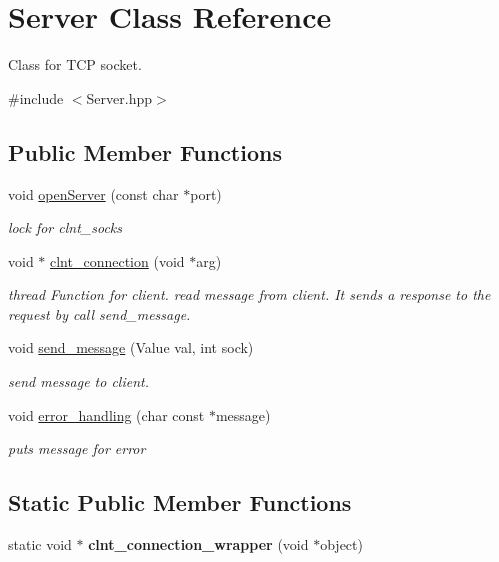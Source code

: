 \hypertarget{class_server}{}\section{Server Class Reference}
\label{class_server}


Class for T\+CP socket.  




{\ttfamily \#include $<$Server.\+hpp$>$}

\subsection*{Public Member Functions}
\begin{DoxyCompactItemize}
\item 
void \mbox{\hyperlink{class_server_aff3205e599f2b9680b38407d4d3fe2fb}{open\+Server}} (const char $\ast$port)
\begin{DoxyCompactList}\small\item\em lock for clnt\+\_\+socks \end{DoxyCompactList}\item 
void $\ast$ \mbox{\hyperlink{class_server_a4adbe902c237615f2ec2ecc21e0f4dfa}{clnt\+\_\+connection}} (void $\ast$arg)
\begin{DoxyCompactList}\small\item\em thread Function for client. read message from client. It sends a response to the request by call send\+\_\+message. \end{DoxyCompactList}\item 
void \mbox{\hyperlink{class_server_ab16fa72c38eb792401edf5698007d805}{send\+\_\+message}} (Value val, int sock)
\begin{DoxyCompactList}\small\item\em send message to client. \end{DoxyCompactList}\item 
void \mbox{\hyperlink{class_server_ab07824cba6467208a7243bacc7073ff4}{error\+\_\+handling}} (char const $\ast$message)
\begin{DoxyCompactList}\small\item\em puts message for error \end{DoxyCompactList}\end{DoxyCompactItemize}
\subsection*{Static Public Member Functions}
\begin{DoxyCompactItemize}
\item 
\mbox{\label{class_server_a5dc6ac4bbf6f91a1c8a00ebb8871c32a}} 
static void $\ast$ {\bfseries clnt\+\_\+connection\+\_\+wrapper} (void $\ast$object)
\end{DoxyCompactItemize}



